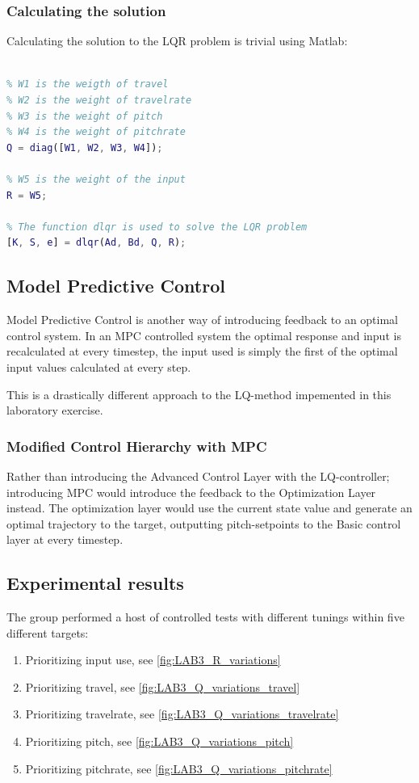 \documentclass[../main.tex]{subfiles}
\begin{document}
\subsubsection{Calculating the solution}
Calculating the solution to the LQR problem is trivial using Matlab:
\begin{lstlisting}[language=Matlab]
% The discrete system described as a state space system, Ad and Bd must be defined

% W1 is the weigth of travel
% W2 is the weight of travelrate
% W3 is the weight of pitch
% W4 is the weight of pitchrate
Q = diag([W1, W2, W3, W4]);

% W5 is the weight of the input
R = W5;

% The function dlqr is used to solve the LQR problem
[K, S, e] = dlqr(Ad, Bd, Q, R);
\end{lstlisting}

\subsection{Model Predictive Control}\label{kap:10_3_mpc}
Model Predictive Control is another way of introducing feedback to an optimal control system. In an MPC controlled system the optimal response and input is recalculated at every timestep, the input used is simply the first of the optimal input values calculated at every step.

This is a drastically different approach to the LQ-method impemented in this laboratory exercise.

\subsubsection{Modified Control Hierarchy with MPC}
Rather than introducing the Advanced Control Layer with the LQ-controller; introducing MPC would introduce the feedback to the Optimization Layer instead. The optimization layer would use the current state value and generate an optimal trajectory to the target, outputting pitch-setpoints to the Basic control layer at every timestep.

\subsection{Experimental results}\label{sec:lab3_result}
The group performed a host of controlled tests with different tunings within five different targets:
\begin{enumerate}
	\item Prioritizing input use, see \cref{fig:LAB3_R_variations}
	\item Prioritizing travel, see \cref{fig:LAB3_Q_variations_travel}
	\item Prioritizing travelrate, see \cref{fig:LAB3_Q_variations_travelrate}
	\item Prioritizing pitch, see \cref{fig:LAB3_Q_variations_pitch}
	\item Prioritizing pitchrate, see \cref{fig:LAB3_Q_variations_pitchrate}
\end{enumerate}
\end{document}

